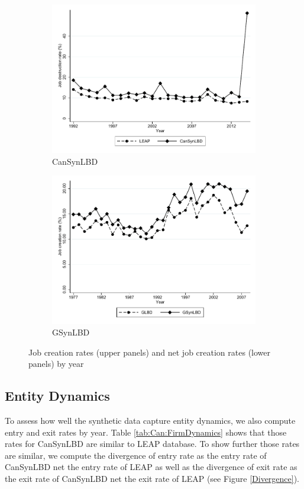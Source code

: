 \begin{figure}
\begin{subfigure}[h]{0.48\linewidth}
\includegraphics[trim=0 0 0 -20,clip,width=\linewidth]{graphs/Job_destruction_rate_by_year_private_bw.pdf}
\caption{CanSynLBD}
\end{subfigure}
\hfill
\begin{subfigure}[h]{0.48\linewidth}
\includegraphics[trim=0 0 0 -20,clip,width=\linewidth]{graphs/Job_destruction_by_year_bw_GsynLBD.pdf}
\caption{GSynLBD}
\end{subfigure}%
\caption{Job creation rates (upper panels) and net job creation rates (lower panels) by year}
\end{figure}


\subsection{Entity Dynamics}
To assess how well the synthetic data capture entity dynamics, we also compute entry and exit rates  by year. Table \ref{tab:Can:FirmDynamics} shows that those rates for CanSynLBD are similar to LEAP database. To show further those rates are similar, we compute the divergence of entry rate as the entry rate of CanSynLBD net the entry rate of LEAP as well as the divergence of exit rate as the exit rate of CanSynLBD net the exit rate of LEAP (see Figure \ref{Divergence}).

